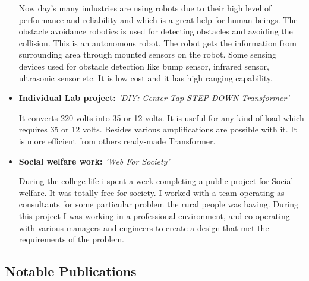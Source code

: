 \documentclass[11pt,a4paper,sans]{moderncv}        %
\begin{document}
\begin{itemize}
{\small{Now day’s many industries are using robots due to their high level of performance and reliability and which is a great help for human beings. The obstacle avoidance robotics is used for detecting obstacles and avoiding the collision. This is an autonomous robot.
The robot gets the information from surrounding area through mounted sensors on the robot. Some sensing devices used for obstacle detection like bump sensor, infrared sensor, ultrasonic sensor etc. It is low cost and it has high ranging capability.}}

\vspace{6pt}

\item{\textbf{Individual Lab project:} \textit{'DIY: Center Tap STEP-DOWN Transformer'}

\vspace{3pt}

\small{It converts 220 volts into 35 or 12 volts. It is useful for any kind of load which requires 35 or 12 volts. Besides various amplifications are possible with it. It is more efficient from others ready-made Transformer.}}

\vspace{6pt}

\item{\textbf{Social welfare work:} \textit{'Web For Society'}

\vspace{3pt}

\small{During the college life i spent a week completing a public project for Social welfare. It was totally free for society. I worked with a team operating as consultants for some particular problem the rural people was having. During this project I was working in a professional environment, and co-operating with various managers and engineers to create a design that met the requirements of the problem.}}

\end{itemize}

\vspace{2pt}

\subsection{Notable Publications}

\vspace{5pt}
\end{document}
